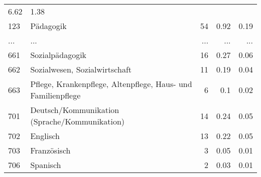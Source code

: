 \begin{longtable}{lXrrr}
          \num[round-mode=places,round-precision=2]{6.62} &
          \num[round-mode=places,round-precision=2]{1.38} \\
        123 & \multicolumn{1}{X}{Pädagogik} & %
          \num{54} &
          \num[round-mode=places,round-precision=2]{0.92} &
          \num[round-mode=places,round-precision=2]{0.19} \\
       ... & ... & ... & ... & ... \\
        661 & \multicolumn{1}{X}{Sozialpädagogik} & %
          \num{16} &
          \num[round-mode=places,round-precision=2]{0.27} &
          \num[round-mode=places,round-precision=2]{0.06} \\

        662 & \multicolumn{1}{X}{Sozialwesen, Sozialwirtschaft} & %
          \num{11} &
          \num[round-mode=places,round-precision=2]{0.19} &
          \num[round-mode=places,round-precision=2]{0.04} \\

        663 & \multicolumn{1}{X}{Pflege, Krankenpflege, Altenpflege, Haus- und Familienpflege} & %
          \num{6} &
          \num[round-mode=places,round-precision=2]{0.1} &
          \num[round-mode=places,round-precision=2]{0.02} \\

        701 & \multicolumn{1}{X}{Deutsch/Kommunikation (Sprache/Kommunikation)} & %
          \num{14} &
          \num[round-mode=places,round-precision=2]{0.24} &
          \num[round-mode=places,round-precision=2]{0.05} \\

        702 & \multicolumn{1}{X}{Englisch} & %
          \num{13} &
          \num[round-mode=places,round-precision=2]{0.22} &
          \num[round-mode=places,round-precision=2]{0.05} \\

        703 & \multicolumn{1}{X}{Französisch} & %
          \num{3} &
          \num[round-mode=places,round-precision=2]{0.05} &
          \num[round-mode=places,round-precision=2]{0.01} \\

        706 & \multicolumn{1}{X}{Spanisch} & %
          \num{2} &
          \num[round-mode=places,round-precision=2]{0.03} &
          \num[round-mode=places,round-precision=2]{0.01} \\


\end{longtable}

